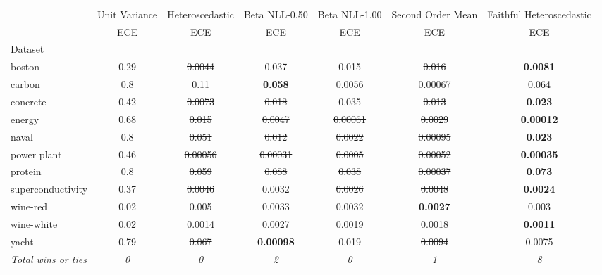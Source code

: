 \begin{tabular}{l|c|c|c|c|c|c}
\toprule
{} & {Unit Variance} & {Heteroscedastic} & {Beta NLL-0.50} & {Beta NLL-1.00} & {Second Order Mean} & {Faithful Heteroscedastic} \\
{} & {ECE} & {ECE} & {ECE} & {ECE} & {ECE} & {ECE} \\
{Dataset} & {} & {} & {} & {} & {} & {} \\
\midrule
boston & 0.29 & \sout{0.0044} & 0.037 & 0.015 & \sout{0.016} & \textbf{0.0081} \\
carbon & 0.8 & \sout{0.11} & \textbf{0.058} & \sout{0.0056} & \sout{0.00067} & 0.064 \\
concrete & 0.42 & \sout{0.0073} & \sout{0.018} & 0.035 & \sout{0.013} & \textbf{0.023} \\
energy & 0.68 & \sout{0.015} & \sout{0.0047} & \sout{0.00061} & \sout{0.0029} & \textbf{0.00012} \\
naval & 0.8 & \sout{0.051} & \sout{0.012} & \sout{0.0022} & \sout{0.00095} & \textbf{0.023} \\
power plant & 0.46 & \sout{0.00056} & \sout{0.00031} & \sout{0.0005} & \sout{0.00052} & \textbf{0.00035} \\
protein & 0.8 & \sout{0.059} & \sout{0.088} & \sout{0.038} & \sout{0.00037} & \textbf{0.073} \\
superconductivity & 0.37 & \sout{0.0046} & 0.0032 & \sout{0.0026} & \sout{0.0048} & \textbf{0.0024} \\
wine-red & 0.02 & 0.005 & 0.0033 & 0.0032 & \textbf{0.0027} & 0.003 \\
wine-white & 0.02 & 0.0014 & 0.0027 & 0.0019 & 0.0018 & \textbf{0.0011} \\
yacht & 0.79 & \sout{0.067} & \textbf{0.00098} & 0.019 & \sout{0.0094} & 0.0075 \\
\textit{{Total wins or ties}} & \textit{0} & \textit{0} & \textit{2} & \textit{0} & \textit{1} & \textit{8} \\
\bottomrule
\end{tabular}
